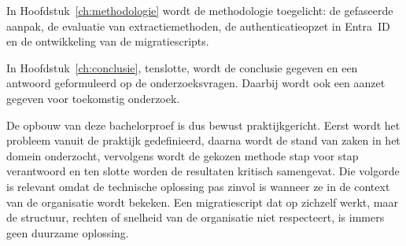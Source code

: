 In Hoofdstuk~\ref{ch:methodologie} wordt de methodologie toegelicht: de gefaseerde aanpak, de evaluatie van extractiemethoden, de authenticatieopzet in Entra~ID en de ontwikkeling van de migratiescripts.

In Hoofdstuk~\ref{ch:conclusie}, tenslotte, wordt de conclusie gegeven en een antwoord geformuleerd op de onderzoeksvragen. Daarbij wordt ook een aanzet gegeven voor toekomstig onderzoek.

De opbouw van deze bachelorproef is dus bewust praktijkgericht. Eerst wordt het probleem vanuit de praktijk gedefinieerd, daarna wordt de stand van zaken in het domein onderzocht, vervolgens wordt de gekozen methode stap voor stap verantwoord en ten slotte worden de resultaten kritisch samengevat. Die volgorde is relevant omdat de technische oplossing pas zinvol is wanneer ze in de context van de organisatie wordt bekeken. Een migratiescript dat op zichzelf werkt, maar de structuur, rechten of snelheid van de organisatie niet respecteert, is immers geen duurzame oplossing.